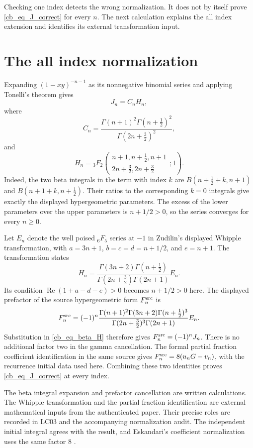 Checking one index detects the wrong normalization. It does not by itself
prove \eqref{cb_eq_J_correct} for every $n$. The next calculation explains
the all index extension and identifies its external transformation input.

\section{The all index normalization}

Expanding $(1-xy)^{-n-1}$ as its nonnegative binomial series and applying
Tonelli's theorem gives
\begin{equation}\label{cb_eq_beta_H}
 J_n=C_nH_n,
\end{equation}
where
\[
 C_n=\frac{\Gamma(n+1)^2\Gamma(n+\tfrac12)^2}
 {\Gamma(2n+\tfrac32)^2},
\]
and
\[
 H_n={}_3F_2\!\left(
 \begin{matrix}n+1,n+\tfrac12,n+1\\
 2n+\tfrac32,2n+\tfrac32\end{matrix};1\right).
\]
Indeed, the two beta integrals in the term with index $k$ are
$B(n+\tfrac12+k,n+1)$ and $B(n+1+k,n+\tfrac12)$.
Their ratios to the corresponding $k=0$ integrals give exactly the displayed
hypergeometric parameters. The excess of the lower parameters over the
upper parameters is $n+1/2>0$, so the series converges for every $n\geq0$.

Let $E_n$ denote the well poised ${}_6F_5$ series at $-1$ in Zudilin's
displayed Whipple transformation, with
$a=3n+1$, $b=c=d=n+1/2$, and $e=n+1$. The transformation states
\[
 H_n=\frac{\Gamma(3n+2)\Gamma(n+\tfrac12)}
 {\Gamma(2n+\tfrac32)\Gamma(2n+1)}E_n.
\]
Its condition $\operatorname{Re}(1+a-d-e)>0$ becomes $n+1/2>0$ here.
The displayed prefactor of the source hypergeometric form $F_n^{\rm src}$
is
\[
 F_n^{\rm src}=(-1)^n
 \frac{\Gamma(n+1)^2\Gamma(3n+2)\Gamma(n+\tfrac12)^3}
 {\Gamma(2n+\tfrac32)^3\Gamma(2n+1)}E_n.
\]
Substitution in \eqref{cb_eq_beta_H} therefore gives
$F_n^{\rm src}=(-1)^nJ_n$. There is no additional factor two in the gamma
cancellation. The formal partial fraction coefficient identification in
the same source gives $F_n^{\rm src}=8(u_nG-v_n)$, with the recurrence
initial data used here. Combining these two identities proves
\eqref{cb_eq_J_correct} at every index.

The beta integral expansion and prefactor cancellation are written
calculations. The Whipple transformation and the partial fraction
identification are external mathematical inputs from the authenticated
paper. Their precise roles are recorded in LC03 and the accompanying
normalization audit. The independent initial integral agrees with the
result, and Eskandari's coefficient normalization uses the same factor $8$
\cite{Eskandari2026}.

